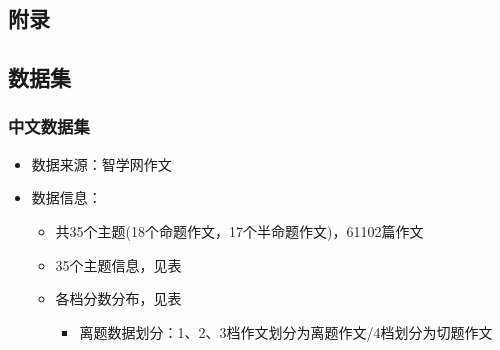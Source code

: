 \documentclass[11pt]{article}
\begin{document}
\begin{CJK}{UTF8}{gkai}
\appendix
\newpage

\section{附录}
\subsection{数据集}
\subsubsection{中文数据集}
\begin{itemize}
  \item 数据来源：智学网作文
  \item 数据信息：
  \begin{itemize}
    \item 共35个主题(18个命题作文，17个半命题作文)，61102篇作文
    \item 35个主题信息，见表
    \item 各档分数分布，见表
    \begin{itemize}
      \item 离题数据划分：1、2、3档作文划分为离题作文/4档划分为切题作文
    \end{itemize}
  \end{itemize}
\end{itemize}


\end{CJK}
\end{document}
